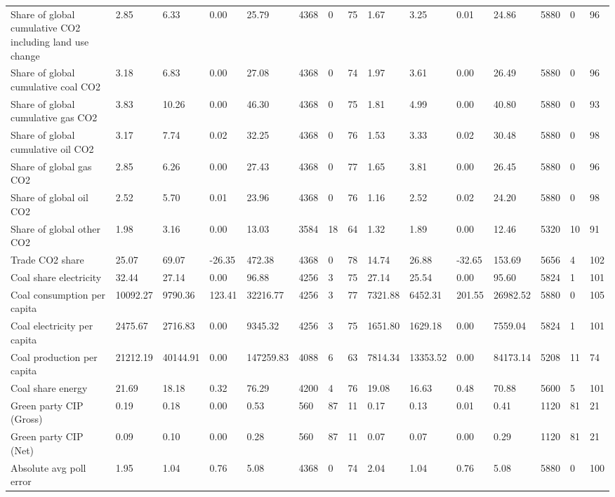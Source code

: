\begin{longtable}{lllllllllllllll}
Share of global cumulative CO2 including land use change & 2.85 & 6.33 & 0.00 & 25.79 & 4368 & 0 & 75 & 1.67 & 3.25 & 0.01 & 24.86 & 5880 & 0 & 96\\
Share of global cumulative coal CO2 & 3.18 & 6.83 & 0.00 & 27.08 & 4368 & 0 & 74 & 1.97 & 3.61 & 0.00 & 26.49 & 5880 & 0 & 96\\
Share of global cumulative gas CO2 & 3.83 & 10.26 & 0.00 & 46.30 & 4368 & 0 & 75 & 1.81 & 4.99 & 0.00 & 40.80 & 5880 & 0 & 93\\
Share of global cumulative oil CO2 & 3.17 & 7.74 & 0.02 & 32.25 & 4368 & 0 & 76 & 1.53 & 3.33 & 0.02 & 30.48 & 5880 & 0 & 98\\
\addlinespace
Share of global gas CO2 & 2.85 & 6.26 & 0.00 & 27.43 & 4368 & 0 & 77 & 1.65 & 3.81 & 0.00 & 26.45 & 5880 & 0 & 96\\
Share of global oil CO2 & 2.52 & 5.70 & 0.01 & 23.96 & 4368 & 0 & 76 & 1.16 & 2.52 & 0.02 & 24.20 & 5880 & 0 & 98\\
Share of global other CO2 & 1.98 & 3.16 & 0.00 & 13.03 & 3584 & 18 & 64 & 1.32 & 1.89 & 0.00 & 12.46 & 5320 & 10 & 91\\
Trade CO2 share & 25.07 & 69.07 & -26.35 & 472.38 & 4368 & 0 & 78 & 14.74 & 26.88 & -32.65 & 153.69 & 5656 & 4 & 102\\
Coal share electricity & 32.44 & 27.14 & 0.00 & 96.88 & 4256 & 3 & 75 & 27.14 & 25.54 & 0.00 & 95.60 & 5824 & 1 & 101\\
\addlinespace
Coal consumption per capita & 10092.27 & 9790.36 & 123.41 & 32216.77 & 4256 & 3 & 77 & 7321.88 & 6452.31 & 201.55 & 26982.52 & 5880 & 0 & 105\\
Coal electricity per capita & 2475.67 & 2716.83 & 0.00 & 9345.32 & 4256 & 3 & 75 & 1651.80 & 1629.18 & 0.00 & 7559.04 & 5824 & 1 & 101\\
Coal production per capita & 21212.19 & 40144.91 & 0.00 & 147259.83 & 4088 & 6 & 63 & 7814.34 & 13353.52 & 0.00 & 84173.14 & 5208 & 11 & 74\\
Coal share energy & 21.69 & 18.18 & 0.32 & 76.29 & 4200 & 4 & 76 & 19.08 & 16.63 & 0.48 & 70.88 & 5600 & 5 & 101\\
Green party CIP (Gross) & 0.19 & 0.18 & 0.00 & 0.53 & 560 & 87 & 11 & 0.17 & 0.13 & 0.01 & 0.41 & 1120 & 81 & 21\\
\addlinespace
Green party CIP (Net) & 0.09 & 0.10 & 0.00 & 0.28 & 560 & 87 & 11 & 0.07 & 0.07 & 0.00 & 0.29 & 1120 & 81 & 21\\
Absolute avg poll error & 1.95 & 1.04 & 0.76 & 5.08 & 4368 & 0 & 74 & 2.04 & 1.04 & 0.76 & 5.08 & 5880 & 0 & 100\\

\end{longtable}
